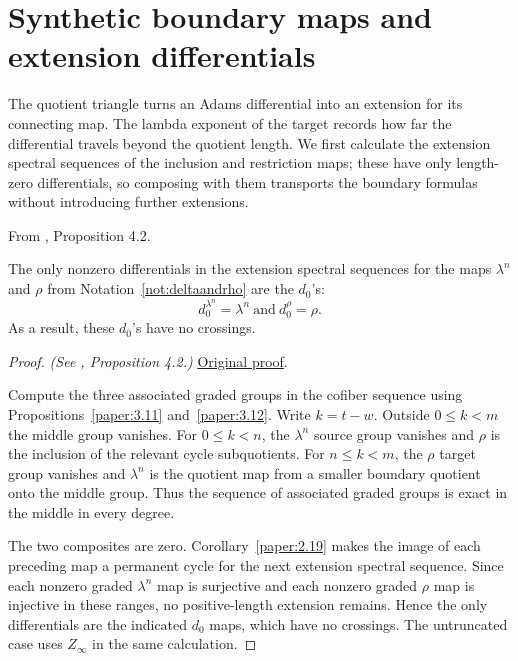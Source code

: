 \section{Synthetic boundary maps and extension differentials}

The quotient triangle turns an Adams differential into an extension for
its connecting map. The lambda exponent of the target records how far
the differential travels beyond the quotient length. We first calculate
the extension spectral sequences of the inclusion and restriction maps;
these have only length-zero differentials, so composing with them
transports the boundary formulas without introducing further extensions.

\begin{proposition}
\label{paper:4.2}
From \cite{LWX126}, Proposition 4.2.\par

\label{prop:9770ae6e}
The only nonzero differentials in the extension spectral sequences for the maps $\lambda^n$ and $\rho$ from Notation~\ref{not:deltaandrho} are the $d_0$'s:
$$d^{\lambda^n}_0=\lambda^n \ \text{and} \ d^{\rho}_0=\rho.$$
As a result, these $d_0$'s have no crossings.



\end{proposition}
\begin{proof}
\textit{(See \cite{LWX126}, Proposition 4.2.)} \href{paper/main.tex.html#L1030}{Original proof}.

Compute the three associated graded groups in the cofiber sequence using Propositions~\ref{paper:3.11} and~\ref{paper:3.12}. Write $k=t-w$. Outside $0\le k<m$ the middle group vanishes. For $0\le k<n$, the $\lambda^n$ source group vanishes and $\rho$ is the inclusion of the relevant cycle subquotients. For $n\le k<m$, the $\rho$ target group vanishes and $\lambda^n$ is the quotient map from a smaller boundary quotient onto the middle group. Thus the sequence of associated graded groups is exact in the middle in every degree.

The two composites are zero. Corollary~\ref{paper:2.19} makes the image of each preceding map a permanent cycle for the next extension spectral sequence. Since each nonzero graded $\lambda^n$ map is surjective and each nonzero graded $\rho$ map is injective in these ranges, no positive-length extension remains. Hence the only differentials are the indicated $d_0$ maps, which have no crossings. The untruncated case uses $Z_\infty$ in the same calculation.
\end{proof}

